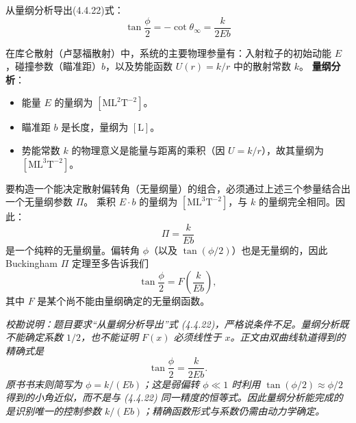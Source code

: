 \begin{exercise}\label{ex:4.17}
从量纲分析导出(4.4.22)式：
$$\tan \frac{\phi}{2} = -\cot \theta_\infty = \frac{k}{2Eb} $$
\end{exercise}
\begin{solution}
在库仑散射（卢瑟福散射）中，系统的主要物理参量有：入射粒子的初始动能 $E$，碰撞参数（瞄准距）$b$，以及势能函数 $U(r) = k/r$ 中的散射常数 $k$。
\textbf{量纲分析}：
\begin{itemize}
    \item 能量 $E$ 的量纲为 $[\mathrm{M} \mathrm{L}^2 \mathrm{T}^{-2}]$。
    \item 瞄准距 $b$ 是长度，量纲为 $[\mathrm{L}]$。
    \item 势能常数 $k$ 的物理意义是能量与距离的乘积（因 $U = k/r$），故其量纲为 $[\mathrm{M} \mathrm{L}^3 \mathrm{T}^{-2}]$。
\end{itemize}
要构造一个能决定散射偏转角（无量纲量）的组合，必须通过上述三个参量结合出一个无量纲参数 $\Pi$。
乘积 $E \cdot b$ 的量纲为 $[\mathrm{M} \mathrm{L}^3 \mathrm{T}^{-2}]$，与 $k$ 的量纲完全相同。因此：
$$ \Pi = \frac{k}{E b} $$
是一个纯粹的无量纲量。偏转角 $\phi$（以及 $\tan(\phi/2)$）也是无量纲的，因此 Buckingham $\Pi$ 定理至多告诉我们
$$
\tan\frac{\phi}{2}=F\!\left(\frac{k}{Eb}\right),
$$
其中 $F$ 是某个尚不能由量纲确定的无量纲函数。

\textit{校勘说明：题目要求“从量纲分析导出”式 (4.4.22)，严格说条件不足。量纲分析既不能确定系数 $1/2$，也不能证明 $F(x)$ 必须线性于 $x$。正文由双曲线轨道得到的精确式是
$$
\tan\frac{\phi}{2}=\frac{k}{2Eb}.
$$
原书书末则简写为 $\phi=k/(Eb)$；这是弱偏转 $\phi\ll1$ 时利用 $\tan(\phi/2)\approx\phi/2$ 得到的小角近似，而不是与 (4.4.22) 同一精度的恒等式。因此量纲分析能完成的是识别唯一的控制参数 $k/(Eb)$；精确函数形式与系数仍需由动力学确定。}
\end{solution}

